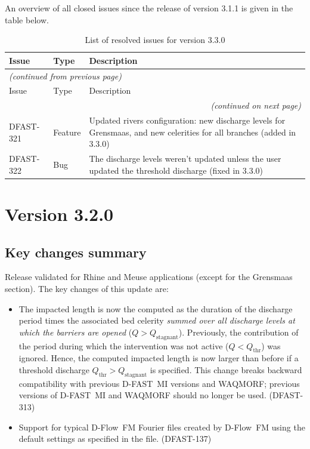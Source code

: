\documentclass[git]{deltares_manual}
\newcommand{\dfmi}{\textrm{D-FAST~MI}\xspace}
\newcommand{\dflowfm}{\textrm{D-Flow~FM}\xspace}
\newcommand{\dfmiversion}{3.3.0}
\begin{document}
An overview of all closed issues since the release of version 3.1.1 is given in the table below.

\begin{longtable}{l|l|p{8cm}}
\caption{List of resolved issues for version \dfmiversion} \\
Issue & Type & Description \\ \hline
\endfirsthead
\multicolumn{3}{l}{\textsl{(continued from previous page)}} \\
Issue & Type & Description \\ \hline
\endhead
\hline \multicolumn{3}{r}{\textsl{(continued on next page)}} \\
\endfoot
\endlastfoot
DFAST-321 & Feature & Updated rivers configuration: new discharge levels for Grensmaas, and new celerities for all branches (added in 3.3.0) \\
DFAST-322 & Bug & The discharge levels weren't updated unless the user updated the threshold discharge (fixed in 3.3.0) \\
\end{longtable}

\section{Version 3.2.0}

\subsection{Key changes summary}
Release validated for Rhine and Meuse applications (except for the Grensmaas section).
The key changes of this update are:

\begin{itemize}
\item The impacted length is now the computed as the duration of the discharge period times the associated bed celerity \emph{summed over all discharge levels at which the barriers are opened} ($Q > Q_\text{stagnant}$).
Previously, the contribution of the period during which the intervention was not active ($Q < Q_\text{thr}$) was ignored.
Hence, the computed impacted length is now larger than before if a threshold discharge $Q_\text{thr} > Q_\text{stagnant}$ is specified.
This change breaks backward compatibility with previous \dfmi versions and WAQMORF; previous versions of \dfmi and WAQMORF should no longer be used. (DFAST-313)
\item Support for typical \dflowfm Fourier files created by \dflowfm using the default settings as specified in the  file. (DFAST-137)
\end{itemize}
\end{document}
